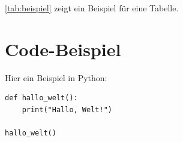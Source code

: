 \autoref{tab:beispiel} zeigt ein Beispiel für eine Tabelle.

\section{Code-Beispiel}

Hier ein Beispiel in Python:

\lstset{style=Python}
\begin{lstlisting}
def hallo_welt():
    print("Hallo, Welt!")
    
hallo_welt()
\end{lstlisting}

\lstset{language=[LaTeX]TeX}
